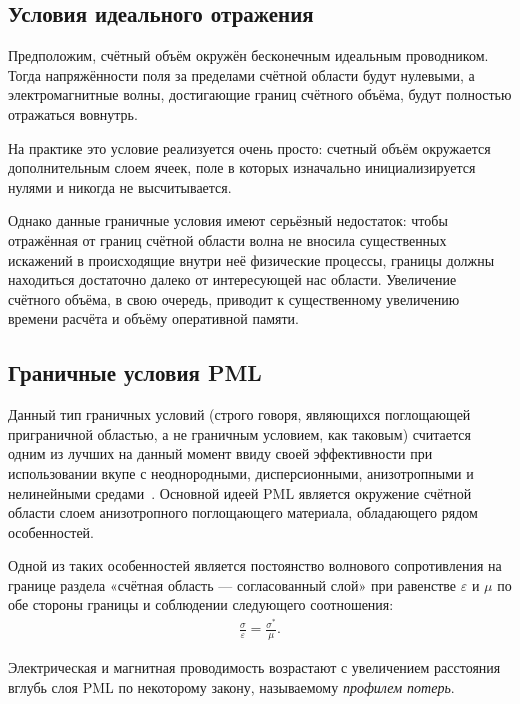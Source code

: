 \subsection{Условия идеального отражения}

Предположим, счётный объём окружён бесконечным идеальным проводником. Тогда 
напряжённости поля за пределами счётной области будут нулевыми, а 
электромагнитные волны, достигающие границ счётного объёма, будут полностью отражаться вовнутрь.

На практике это условие реализуется очень просто: счетный объём окружается
дополнительным слоем ячеек, поле в которых изначально
инициализируется нулями и никогда не высчитывается.

Однако данные граничные условия имеют серьёзный недостаток: чтобы отражённая от 
границ счётной области волна не вносила существенных искажений в происходящие внутри неё физические процессы, границы должны находиться достаточно далеко от интересующей нас области. Увеличение счётного объёма, в свою очередь, приводит к 
существенному увеличению времени расчёта и объёму оперативной памяти.

\subsection{Граничные условия PML}

Данный тип граничных условий (строго говоря, являющихся поглощающей приграничной областью, а не граничным условием, как таковым) считается 
одним из лучших на данный момент ввиду своей эффективности при использовании вкупе с неоднородными, дисперсионными, анизотропными и нелинейными 
средами~\cite{Taflove2005}. Основной идеей PML является окружение счётной области слоем анизотропного поглощающего материала, обладающего рядом особенностей.

Одной из таких особенностей является постоянство волнового сопротивления на границе раздела «счётная область --- согласованный слой» при равенстве $ \varepsilon $ 
и $ \mu $ по обе стороны границы и соблюдении следующего соотношения:
\begin{align*}
\frac{\sigma}{\varepsilon} = \frac{\sigma^{*}}{\mu}.
\end{align*}

Электрическая и магнитная проводимость возрастают с увеличением расстояния
вглубь слоя PML по некоторому закону, называемому \emph{профилем потерь}.

